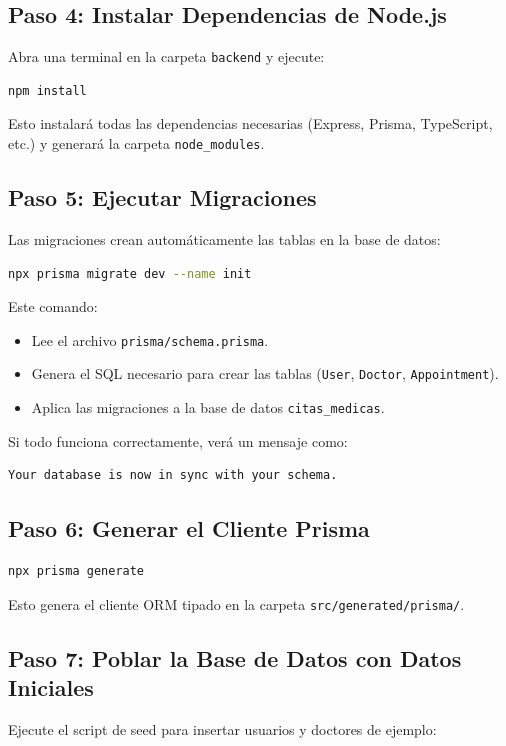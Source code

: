 \documentclass[12pt,a4paper]{article}
\begin{document}
\subsection{Paso 4: Instalar Dependencias de Node.js}
Abra una terminal en la carpeta \texttt{backend} y ejecute:

\begin{lstlisting}[language=bash]
npm install
\end{lstlisting}
Esto instalará todas las dependencias necesarias (Express, Prisma, TypeScript, etc.) y generará la carpeta \texttt{node\_modules}.

\subsection{Paso 5: Ejecutar Migraciones}
Las migraciones crean automáticamente las tablas en la base de datos:

\begin{lstlisting}[language=bash]
npx prisma migrate dev --name init
\end{lstlisting}

Este comando:
\begin{itemize}
    \item Lee el archivo \texttt{prisma/schema.prisma}.
    \item Genera el SQL necesario para crear las tablas (\texttt{User}, \texttt{Doctor}, \texttt{Appointment}).
    \item Aplica las migraciones a la base de datos \texttt{citas\_medicas}.
\end{itemize}

Si todo funciona correctamente, verá un mensaje como:
\begin{lstlisting}
Your database is now in sync with your schema.
\end{lstlisting}

\subsection{Paso 6: Generar el Cliente Prisma}
\begin{lstlisting}[language=bash]
npx prisma generate
\end{lstlisting}
Esto genera el cliente ORM tipado en la carpeta \texttt{src/generated/prisma/}.

\subsection{Paso 7: Poblar la Base de Datos con Datos Iniciales}
Ejecute el script de seed para insertar usuarios y doctores de ejemplo:
\end{document}
